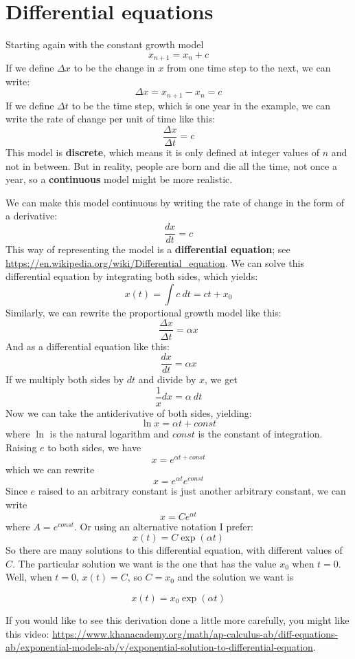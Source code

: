 \documentclass[12pt]{book}
\theoremstyle{exercise}
\begin{document}
\section{Differential equations}
\label{diffeq}

Starting again with the constant growth model
%
\[ x_{n+1} = x_n + c \]
%
If we define $\Delta x$ to be the change in $x$ from one time step to the next, we can write:
%
\[ \Delta x = x_{n+1} - x_n = c \]
%
If we define $\Delta t$ to be the time step, which is one year in the example, we can write the rate of change per unit of time like this:
%
\[ \frac{\Delta x}{\Delta t} = c \]
%
This model is {\bf discrete}, which means it is only defined at integer values of $n$ and not in between.  But in reality, people are born and die all the time, not once a year, so a {\bf continuous} model might be more realistic.

We can make this model continuous by writing the rate of change in the form of a derivative:
%
\[ \frac{dx}{dt} = c \]
%
This way of representing the model is a {\bf differential equation}; see \url{https://en.wikipedia.org/wiki/Differential_equation}.  We can solve this differential equation by integrating both sides, which yields:
%
\[ x(t) = \int c~dt = c t + x_0 \]
%
Similarly, we can rewrite the proportional growth model like this:
%
\[ \frac{\Delta x}{\Delta t} = \alpha x \]
%
And as a differential equation like this:
%
\[ \frac{dx}{dt} = \alpha x \]
%
If we multiply both sides by $dt$ and divide by $x$, we get
%
\[ \frac{1}{x} dx = \alpha~dt \] 
%
Now we can take the antiderivative of both sides, yielding:
%
\[ \ln x = \alpha t + const \]
%
where $\ln$ is the natural logarithm and $const$ is the constant of integration.  Raising $e$ to both sides, we have
%
\[ x = e^{\alpha t + const} \]
%
which we can rewrite
%
\[ x = e^{\alpha t} e^{const} \]
%
Since $e$ raised to an arbitrary constant is just another arbitrary constant, we can write
%
\[ x = Ce^{\alpha t} \]
%
where $A = e^{const}$.  Or using an alternative notation I prefer:
%
\[ x(t) = C \exp(\alpha t) \]
%
So there are many solutions to this differential equation, with different values of $C$.  The particular solution we want is the one that has the value $x_0$ when $t=0$.  Well, when $t=0$, $x(t) = C$, so $C = x_0$ and the solution we want is

\[ x(t) = x_0 \exp(\alpha t) \]

If you would like to see this derivation done a little more carefully, you might like this video: \url{https://www.khanacademy.org/math/ap-calculus-ab/diff-equations-ab/exponential-models-ab/v/exponential-solution-to-differential-equation}.
\end{document}
